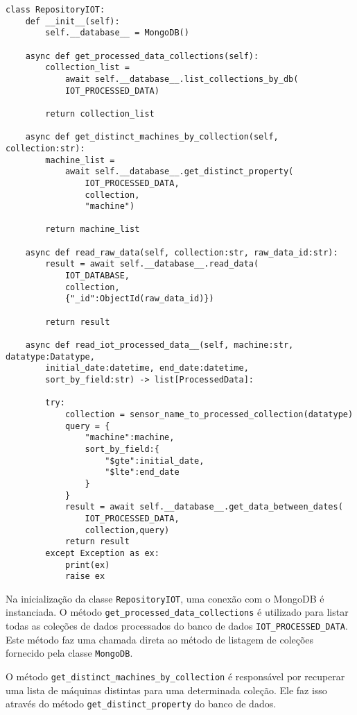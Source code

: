 \begin{verbatim}
class RepositoryIOT:
    def __init__(self):
        self.__database__ = MongoDB()
    
    async def get_processed_data_collections(self):
        collection_list = 
            await self.__database__.list_collections_by_db(
            IOT_PROCESSED_DATA)
    
        return collection_list
        
    async def get_distinct_machines_by_collection(self, collection:str):
        machine_list = 
            await self.__database__.get_distinct_property(
                IOT_PROCESSED_DATA,
                collection,
                "machine")

        return machine_list
    
    async def read_raw_data(self, collection:str, raw_data_id:str):
        result = await self.__database__.read_data(
            IOT_DATABASE,
            collection,
            {"_id":ObjectId(raw_data_id)})

        return result
    
    async def read_iot_processed_data__(self, machine:str, datatype:Datatype, 
        initial_date:datetime, end_date:datetime, 
        sort_by_field:str) -> list[ProcessedData]:
        
        try:
            collection = sensor_name_to_processed_collection(datatype)
            query = {
                "machine":machine,
                sort_by_field:{
                    "$gte":initial_date,
                    "$lte":end_date
                }
            }
            result = await self.__database__.get_data_between_dates(
                IOT_PROCESSED_DATA,
                collection,query)
            return result
        except Exception as ex:
            print(ex)
            raise ex
\end{verbatim}

Na inicialização da classe \texttt{RepositoryIOT}, uma conexão com o MongoDB é instanciada. O método \texttt{get\_processed\_data\_collections} é utilizado para listar todas as coleções de dados processados do banco de dados \texttt{IOT\_PROCESSED\_DATA}. Este método faz uma chamada direta ao método de listagem de coleções fornecido pela classe \texttt{MongoDB}.

O método \texttt{get\_distinct\_machines\_by\_collection} é responsável por recuperar uma lista de máquinas distintas para uma determinada coleção. Ele faz isso através do método \texttt{get\_distinct\_property} do banco de dados.

